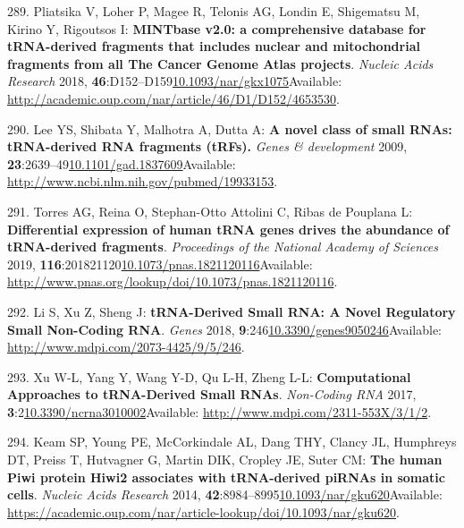 \documentclass[
]{book}
\begin{document}
\leavevmode\hypertarget{ref-Pliatsika2018}{}%
289. Pliatsika V, Loher P, Magee R, Telonis AG, Londin E, Shigematsu M, Kirino Y, Rigoutsos I: \textbf{MINTbase v2.0: a comprehensive database for tRNA-derived fragments that includes nuclear and mitochondrial fragments from all The Cancer Genome Atlas projects}. \emph{Nucleic Acids Research} 2018, \textbf{46}:D152--D159\href{https://doi.org/10.1093/nar/gkx1075}{10.1093/nar/gkx1075}Available: \url{http://academic.oup.com/nar/article/46/D1/D152/4653530}.

\leavevmode\hypertarget{ref-Lee2009}{}%
290. Lee YS, Shibata Y, Malhotra A, Dutta A: \textbf{A novel class of small RNAs: tRNA-derived RNA fragments (tRFs).} \emph{Genes \& development} 2009, \textbf{23}:2639--49\href{https://doi.org/10.1101/gad.1837609}{10.1101/gad.1837609}Available: \url{http://www.ncbi.nlm.nih.gov/pubmed/19933153}.

\leavevmode\hypertarget{ref-Torres2019}{}%
291. Torres AG, Reina O, Stephan-Otto Attolini C, Ribas de Pouplana L: \textbf{Differential expression of human tRNA genes drives the abundance of tRNA-derived fragments}. \emph{Proceedings of the National Academy of Sciences} 2019, \textbf{116}:201821120\href{https://doi.org/10.1073/pnas.1821120116}{10.1073/pnas.1821120116}Available: \url{http://www.pnas.org/lookup/doi/10.1073/pnas.1821120116}.

\leavevmode\hypertarget{ref-Li2018a}{}%
292. Li S, Xu Z, Sheng J: \textbf{tRNA-Derived Small RNA: A Novel Regulatory Small Non-Coding RNA}. \emph{Genes} 2018, \textbf{9}:246\href{https://doi.org/10.3390/genes9050246}{10.3390/genes9050246}Available: \url{http://www.mdpi.com/2073-4425/9/5/246}.

\leavevmode\hypertarget{ref-Xu2017a}{}%
293. Xu W-L, Yang Y, Wang Y-D, Qu L-H, Zheng L-L: \textbf{Computational Approaches to tRNA-Derived Small RNAs}. \emph{Non-Coding RNA} 2017, \textbf{3}:2\href{https://doi.org/10.3390/ncrna3010002}{10.3390/ncrna3010002}Available: \url{http://www.mdpi.com/2311-553X/3/1/2}.

\leavevmode\hypertarget{ref-Keam2014}{}%
294. Keam SP, Young PE, McCorkindale AL, Dang THY, Clancy JL, Humphreys DT, Preiss T, Hutvagner G, Martin DIK, Cropley JE, Suter CM: \textbf{The human Piwi protein Hiwi2 associates with tRNA-derived piRNAs in somatic cells}. \emph{Nucleic Acids Research} 2014, \textbf{42}:8984--8995\href{https://doi.org/10.1093/nar/gku620}{10.1093/nar/gku620}Available: \url{https://academic.oup.com/nar/article-lookup/doi/10.1093/nar/gku620}.
\end{document}
